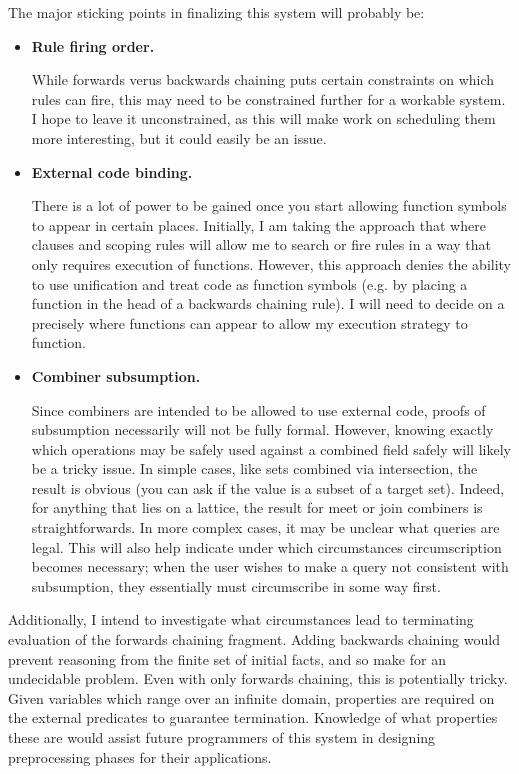 The major sticking points in finalizing this system will probably be:
\begin{itemize}
\item {\bf Rule firing order.}

While forwards verus backwards chaining puts certain constraints on which rules can fire, this may need to be constrained further for a workable system.
I hope to leave it unconstrained, as this will make work on scheduling them more interesting, but it could easily be an issue.

\item {\bf External code binding.}

There is a lot of power to be gained once you start allowing function symbols to appear in certain places.
Initially, I am taking the approach that where clauses and scoping rules will allow me to search or fire rules in a way that only requires execution of functions.
However, this approach denies the ability to use unification and treat code as function symbols (e.g. by placing a function in the head of a backwards chaining rule).
I will need to decide on a precisely where functions can appear to allow my execution strategy to function.

\item {\bf Combiner subsumption.}

Since combiners are intended to be allowed to use external code, proofs of subsumption necessarily will not be fully formal.
However, knowing exactly which operations may be safely used against a combined field safely will likely be a tricky issue.
In simple cases, like sets combined via intersection, the result is obvious (you can ask if the value is a subset of a target set).
Indeed, for anything that lies on a lattice, the result for meet or join combiners is straightforwards.
In more complex cases, it may be unclear what queries are legal.
This will also help indicate under which circumstances circumscription becomes necessary;
when the user wishes to make a query not consistent with subsumption, they essentially must circumscribe in some way first.
\end{itemize}

Additionally, I intend to investigate what circumstances lead to terminating evaluation of the forwards chaining fragment.
Adding backwards chaining would prevent reasoning from the finite set of initial facts, and so make for an undecidable problem.
Even with only forwards chaining, this is potentially tricky.
Given variables which range over an infinite domain, properties are required on the external predicates to guarantee termination.
Knowledge of what properties these are would assist future programmers of this system in designing preprocessing phases for their applications.

